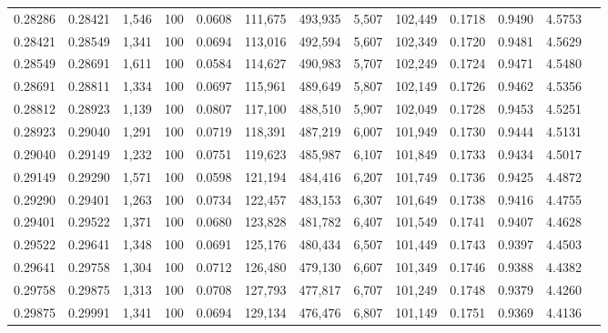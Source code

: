 \begin{tabular}{rrrrrrrrrrrrr}
0.28286 & 0.28421 & 1,546 & 100 &                                     0.0608 & 111,675 & 493,935 &   5,507 & 102,449 & 0.1718 & 0.9490 & 4.5753 \\
0.28421 & 0.28549 & 1,341 & 100 &                                     0.0694 & 113,016 & 492,594 &   5,607 & 102,349 & 0.1720 & 0.9481 & 4.5629 \\
0.28549 & 0.28691 & 1,611 & 100 &                                     0.0584 & 114,627 & 490,983 &   5,707 & 102,249 & 0.1724 & 0.9471 & 4.5480 \\
0.28691 & 0.28811 & 1,334 & 100 &                                     0.0697 & 115,961 & 489,649 &   5,807 & 102,149 & 0.1726 & 0.9462 & 4.5356 \\
0.28812 & 0.28923 & 1,139 & 100 &                                     0.0807 & 117,100 & 488,510 &   5,907 & 102,049 & 0.1728 & 0.9453 & 4.5251 \\
0.28923 & 0.29040 & 1,291 & 100 &                                     0.0719 & 118,391 & 487,219 &   6,007 & 101,949 & 0.1730 & 0.9444 & 4.5131 \\
0.29040 & 0.29149 & 1,232 & 100 &                                     0.0751 & 119,623 & 485,987 &   6,107 & 101,849 & 0.1733 & 0.9434 & 4.5017 \\
0.29149 & 0.29290 & 1,571 & 100 &                                     0.0598 & 121,194 & 484,416 &   6,207 & 101,749 & 0.1736 & 0.9425 & 4.4872 \\
0.29290 & 0.29401 & 1,263 & 100 &                                     0.0734 & 122,457 & 483,153 &   6,307 & 101,649 & 0.1738 & 0.9416 & 4.4755 \\
0.29401 & 0.29522 & 1,371 & 100 &                                     0.0680 & 123,828 & 481,782 &   6,407 & 101,549 & 0.1741 & 0.9407 & 4.4628 \\
0.29522 & 0.29641 & 1,348 & 100 &                                     0.0691 & 125,176 & 480,434 &   6,507 & 101,449 & 0.1743 & 0.9397 & 4.4503 \\
0.29641 & 0.29758 & 1,304 & 100 &                                     0.0712 & 126,480 & 479,130 &   6,607 & 101,349 & 0.1746 & 0.9388 & 4.4382 \\
0.29758 & 0.29875 & 1,313 & 100 &                                     0.0708 & 127,793 & 477,817 &   6,707 & 101,249 & 0.1748 & 0.9379 & 4.4260 \\
0.29875 & 0.29991 & 1,341 & 100 &                                     0.0694 & 129,134 & 476,476 &   6,807 & 101,149 & 0.1751 & 0.9369 & 4.4136 \\

\end{tabular}
